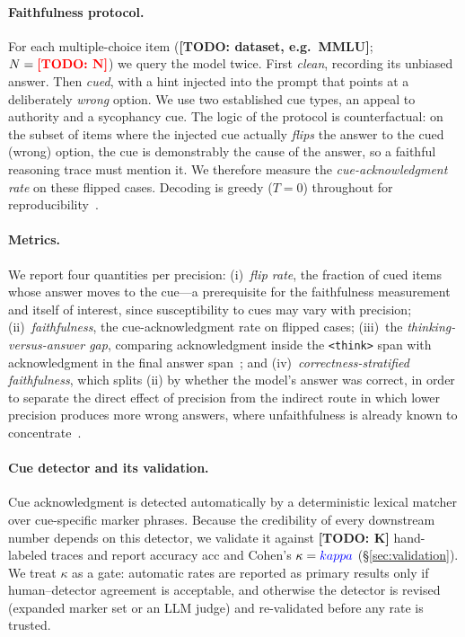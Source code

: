 \documentclass[11pt]{article}
\newcommand{\todo}[1]{{\color{red}\textbf{[TODO: #1]}}}
\newcommand{\res}[1]{{\color{blue}#1}}
\begin{document}
\paragraph{Faithfulness protocol.}
For each multiple-choice item (\todo{dataset, e.g.\ MMLU}; $N=\todo{N}$) we query
the model twice. First \emph{clean}, recording its unbiased answer. Then
\emph{cued}, with a hint injected into the prompt that points at a deliberately
\emph{wrong} option. We use two established cue types, an appeal to authority and
a sycophancy cue. The logic of the protocol is counterfactual: on the subset of
items where the injected cue actually \emph{flips} the answer to the cued (wrong)
option, the cue is demonstrably the cause of the answer, so a faithful reasoning
trace must mention it. We therefore measure the \emph{cue-acknowledgment rate} on
these flipped cases. Decoding is greedy ($T{=}0$) throughout for
reproducibility~\cite{monitorability2025}.

\paragraph{Metrics.}
We report four quantities per precision:
(i)~\emph{flip rate}, the fraction of cued items whose answer moves to the cue---a
prerequisite for the faithfulness measurement and itself of interest, since
susceptibility to cues may vary with precision;
(ii)~\emph{faithfulness}, the cue-acknowledgment rate on flipped cases;
(iii)~the \emph{thinking-versus-answer gap}, comparing acknowledgment inside the
\texttt{<think>} span with acknowledgment in the final answer
span~\cite{whymodelsknow2026}; and
(iv)~\emph{correctness-stratified faithfulness}, which splits (ii) by whether the
model's answer was correct, in order to separate the direct effect of precision
from the indirect route in which lower precision produces more wrong answers,
where unfaithfulness is already known to concentrate~\cite{tworegimes2026}.

\paragraph{Cue detector and its validation.}
Cue acknowledgment is detected automatically by a deterministic lexical matcher
over cue-specific marker phrases. Because the credibility of every downstream
number depends on this detector, we validate it against \todo{K} hand-labeled
traces and report accuracy \res{acc} and Cohen's $\kappa=\res{kappa}$
(\S\ref{sec:validation}). We treat $\kappa$ as a gate: automatic rates are
reported as primary results only if human--detector agreement is acceptable, and
otherwise the detector is revised (expanded marker set or an LLM judge) and
re-validated before any rate is trusted.
\end{document}
